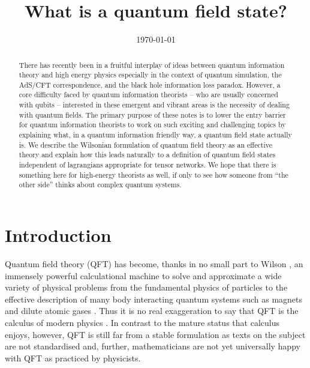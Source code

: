 \documentclass[11pt]{amsart}
\title{What is a quantum field state?}
\date{\today}                                           %
\theoremstyle{plain}%
\theoremstyle{definition}
\theoremstyle{remark}
\begin{document}
\begin{abstract} 
There has recently been in a fruitful interplay of ideas between quantum information theory and high energy physics especially in the context of quantum simulation, the AdS/CFT correspondence, and the black hole information loss paradox. However, a core difficulty faced by quantum information theorists -- who are usually concerned with qubits -- interested in these emergent and vibrant areas is the necessity of dealing with quantum fields. The primary purpose of these notes is to lower the entry barrier for quantum information theorists to work on such exciting and challenging topics by explaining what, in a quantum information friendly way, a quantum field state actually is. We describe the Wilsonian formulation of quantum field theory as an effective theory and explain how this leads naturally to a definition of quantum field states independent of lagrangians appropriate for tensor networks. We hope that there is something here for high-energy theorists as well, if only to see how someone from ``the other side'' thinks about complex quantum systems.
\end{abstract}

\maketitle

\section{Introduction}
Quantum field theory (QFT) has become, thanks in no small part to Wilson 
\cite{wilson_renormalization_1974,wilson_renormalization_1975}, an immensely powerful calculational machine to solve and approximate a wide variety of physical problems from the fundamental physics of particles \cite{peskin_introduction_1995,weinberg_quantum_1996,weinberg_quantum_1996-1,weinberg_quantum_2000} to the effective description of many body interacting quantum systems such as magnets and dilute atomic gases \cite{fradkin_field_2013}. Thus it is no real exaggeration to say that QFT is the calculus of modern physics \cite{witten_surface_2006,seiberg_nathan_2014}. In contrast to the mature status that calculus enjoys, however, QFT is still far from a stable formulation \cite{howard_georgi_particles_2012,moore_physical_2014,seiberg_nathan_2014} as texts on the subject are not standardised and, further,  mathematicians are not yet universally happy with QFT as practiced by physicists. 
\end{document}

